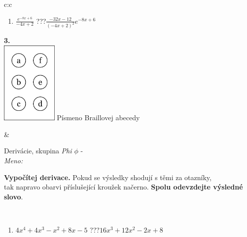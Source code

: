 \documentclass[10pt]{report}
\begin{document}
\begin{tabular}{c:c}
\begin{minipage}[c][104.5mm][t]{0.5\linewidth}
\begin{center}
\begin{minipage}{0.79\linewidth}
\begin{center}
\begin{varwidth}{\linewidth}
\begin{enumerate}
\item $\frac{e^{-8x+6}}{-4x+2}$\quad \dotfill\; ???\;\dotfill \quad $\frac{-32x-12}{(-4x+2)^2}e^{-8x+6}$
\end{enumerate}
\end{varwidth}
\end{center}
\end{minipage}
\begin{minipage}{0.20\linewidth}
\begin{center}
{\Huge\bfseries 3.} \\[2mm]
\includegraphics[height=40mm]{../images/braille.png}
{\small Písmeno Braillovej abecedy}
\end{center}
\end{minipage}
\end{center}
\end{minipage}
&
\begin{minipage}[c][104.5mm][t]{0.5\linewidth}
\begin{center}
\vspace{7mm}
{\huge Derivácie, skupina \textit{Phi $\phi$} -}\\[5mm]
\textit{Meno:}\phantom{xxxxxxxxxxxxxxxxxxxxxxxxxxxxxxxxxxxxxxxxxxxxxxxxxxxxxxxxxxxxxxxxx}\\[5mm]
\begin{minipage}{0.95\linewidth}
\begin{center}
\textbf{Vypočítej derivace.} Pokud se výsledky shodují s těmi za otazníky,\\tak napravo obarvi příslušející kroužek načerno. \textbf{Spolu odevzdejte výsledné slovo}.
\end{center}
\end{minipage}
\\[1mm]
\begin{minipage}{0.79\linewidth}
\begin{center}
\begin{varwidth}{\linewidth}
\begin{enumerate}
\normalsize
\item $4x^4+4x^3-x^2+8x-5$\quad \dotfill\; ???\;\dotfill \quad $16x^3+12x^2-2x+8$

\end{enumerate}
\end{varwidth}
\end{center}
\end{minipage}
\end{center}
\end{minipage}
\end{tabular}
\end{document}
